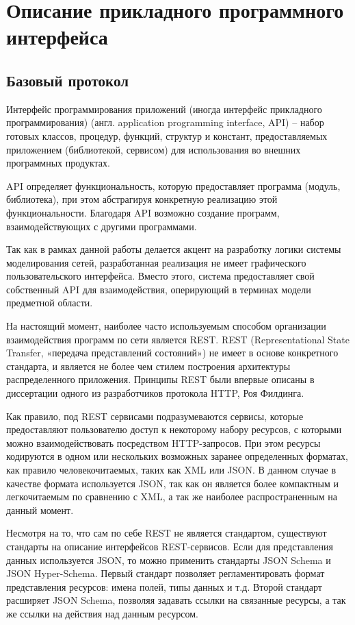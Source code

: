 \section{Описание прикладного программного интерфейса}
\subsection{Базовый протокол}

Интерфейс программирования приложений (иногда интерфейс прикладного программирования) (англ. application programming interface, API) --  набор готовых классов, процедур, функций, структур и констант, предоставляемых приложением (библиотекой, сервисом) для использования во внешних программных продуктах.

API определяет функциональность, которую предоставляет программа (модуль, библиотека), при этом абстрагируя конкретную реализацию этой функциональности. Благодаря API возможно создание
программ, взаимодействующих с другими программами.

Так как в рамках данной работы делается акцент на разработку логики системы моделирования сетей,
разработанная реализация не имеет графического пользовательского интерфейса. Вместо этого,
система предоставляет свой собственный API для взаимодействия, оперирующий в терминах 
модели предметной области.

На настоящий момент, наиболее часто используемым способом организации взаимодействия
программ по сети является REST. REST (Representational State Transfer, «передача представлений 
состояний») не имеет в основе конкретного стандарта, и является не более чем стилем построения 
архитектуры распределенного приложения. Принципы REST были впервые описаны в диссертации
одного из разработчиков протокола HTTP, Роя Филдинга.

Как правило, под REST сервисами подразумеваются сервисы, которые предоставляют пользователю
доступ к некоторому набору ресурсов, с которыми можно взаимодействовать посредством
HTTP-запросов. При этом ресурсы кодируются в одном или нескольких возможных заранее
определенных форматах, как правило человекочитаемых, таких как XML или JSON.
В данном случае в качестве формата используется JSON, так как он является более компактным
и легкочитаемым по сравнению с XML, а так же наиболее распространенным на данный момент.

Несмотря на то, что сам по себе REST не является стандартом, существуют стандарты на описание
интерфейсов REST-сервисов. Если для представления данных используется JSON, то можно
применить стандарты JSON Schema и JSON Hyper-Schema. Первый стандарт позволяет
регламентировать формат представления ресурсов: имена полей, типы данных и т.д. Второй
стандарт расширяет JSON Schema, позволяя задавать ссылки на связанные ресурсы, а так же
ссылки на действия над данным ресурсом.

